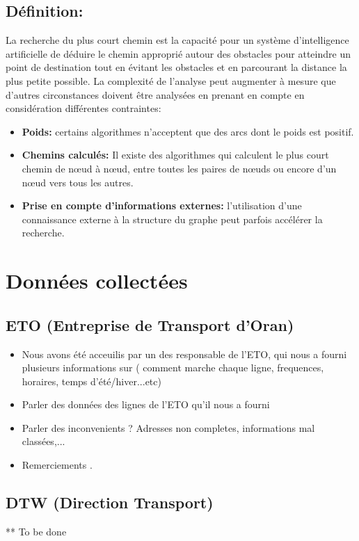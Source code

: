 \subsection{Définition:}
La recherche du plus court chemin est la capacité pour un système d'intelligence artificielle de déduire le chemin approprié autour des obstacles pour atteindre un point de destination tout en évitant les obstacles et en parcourant la distance la plus petite possible. La complexité de l'analyse peut augmenter à mesure que d'autres circonstances doivent être analysées en prenant en compte en considération différentes contraintes:
\begin{itemize}
	\item \textbf{Poids:} certains algorithmes n'acceptent que des arcs dont le poids est positif.
	\item \textbf{Chemins calculés:} Il existe des algorithmes qui calculent le plus court chemin de nœud à nœud, entre toutes les paires de nœuds ou encore d'un nœud vers tous les autres.
	\item \textbf{Prise en compte d'informations externes:} l'utilisation d'une connaissance externe à la structure du graphe peut parfois accélérer la recherche.
\end{itemize}






\section{Données collectées}
\subsection{ETO (Entreprise de Transport d'Oran)}
\begin{itemize}
	\item Nous avons été acceuilis par un des responsable de l'ETO, qui nous a fourni plusieurs informations sur ( comment marche chaque ligne, frequences, horaires, temps d'été/hiver...etc)
	\item Parler des données des lignes de l'ETO qu'il nous a fourni
	\item Parler des inconvenients ? Adresses non completes, informations mal classées,...
	\item Remerciements .
\end{itemize}
\subsection{DTW (Direction Transport)}
** To be done
